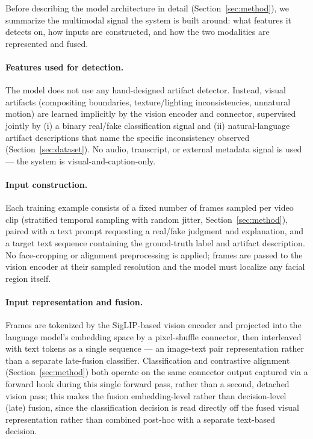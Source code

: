 \documentclass[acmsmall,review=false]{acmart}
\begin{document}
Before describing the model architecture in detail (Section~\ref{sec:method}),
we summarize the multimodal signal the system is built around: what features
it detects on, how inputs are constructed, and how the two modalities are
represented and fused.

\paragraph{Features used for detection.} The model does not use any hand-designed
artifact detector. Instead, visual artifacts (compositing boundaries,
texture/lighting inconsistencies, unnatural motion) are learned implicitly by
the vision encoder and connector, supervised jointly by (i) a binary real/fake
classification signal and (ii) natural-language artifact descriptions that
name the specific inconsistency observed (Section~\ref{sec:dataset}). No audio,
transcript, or external metadata signal is used --- the system is
visual-and-caption-only.

\paragraph{Input construction.} Each training example consists of a fixed
number of frames sampled per video clip (stratified temporal sampling with
random jitter, Section~\ref{sec:method}), paired with a text prompt requesting
a real/fake judgment and explanation, and a target text sequence containing
the ground-truth label and artifact description. No face-cropping or alignment
preprocessing is applied; frames are passed to the vision encoder at their
sampled resolution and the model must localize any facial region itself.

\paragraph{Input representation and fusion.} Frames are tokenized by the
SigLIP-based vision encoder and projected into the language model's embedding
space by a pixel-shuffle connector, then interleaved with text tokens as a
single sequence --- an image-text pair representation rather than a separate
late-fusion classifier. Classification and contrastive alignment
(Section~\ref{sec:method}) both operate on the same connector output captured
via a forward hook during this single forward pass, rather than a second,
detached vision pass; this makes the fusion embedding-level rather than
decision-level (late) fusion, since the classification decision is read
directly off the fused visual representation rather than combined post-hoc
with a separate text-based decision.
\end{document}
